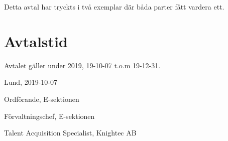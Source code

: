 \documentclass[10pt]{article}
\def\date{2019-10-07} %
\begin{document}
        Detta avtal har tryckts i två exemplar där båda parter fått vardera ett.
        
        \section{Avtalstid}
        Avtalet gäller under 2019, 19-10-07 t.o.m 19-12-31.



		
        \begin{signatures}{3}
            Lund, \date
            \signature{Edvard Carlsson}{Ordförande, E-sektionen}
            \signature{Henrik Ramström}{Förvaltningschef, E-sektionen}
            \signature{Emma Book}{Talent Acquisition Specialist, Knightec AB
}
        \end{signatures}
    
\end{document}
